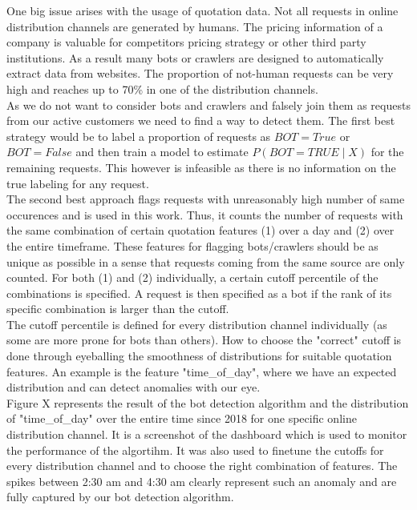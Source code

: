 \documentclass[12pt,titlepage]{article}
\begin{document}
One big issue arises with the usage of quotation data. Not all requests in online distribution channels are generated by humans. The pricing information of a company is valuable for competitors pricing strategy or other third party institutions. As a result many bots or crawlers are designed to automatically extract data from websites. The proportion of not-human requests can be very high and reaches up to 70\% in one of the distribution channels. \\
As we do not want to consider bots and crawlers and falsely join them as requests from our active customers we need to find a way to detect them. The first best strategy would be to label a proportion of requests as $BOT=True$ or $BOT=False$ and then train a model to estimate $P(BOT=TRUE \mid X)$ for the remaining requests. This however is infeasible as there is no information on the true labeling for any request. \\
The second best approach flags requests with unreasonably high number of same occurences and is used in this work. Thus, it counts the number of requests with the same combination of certain quotation features (1) over a day and (2) over the entire timeframe. These features for flagging bots/crawlers should be as unique as possible in a sense that requests coming from the same source are only counted. For both (1) and (2) individually, a certain cutoff percentile of the combinations is specified. A request is then specified as a bot if the rank of its specific combination is larger than the cutoff. \\
The cutoff percentile is defined for every distribution channel individually (as some are more prone for bots than others). How to choose the "correct" cutoff is done through eyeballing the smoothness of distributions for suitable quotation features. An example is the feature "time\_of\_day", where we have an expected distribution and can detect anomalies with our eye. \\
Figure X represents the result of the bot detection algorithm and the distribution of "time\_of\_day" over the entire time since 2018 for one specific online distribution channel. It is a screenshot of the dashboard which is used to monitor the performance of the algortihm. It was also used to finetune the cutoffs for every distribution channel and to choose the right combination of features. The spikes between 2:30 am and 4:30 am clearly represent such an anomaly and are fully captured by our bot detection algorithm. \\
\end{document}
